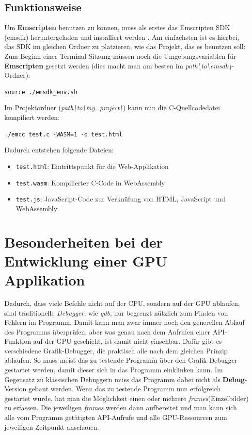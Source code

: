 \documentclass[oneside]{ausarbeitung}
\begin{document}
\subsection{Funktionsweise}
Um \textbf{Emscripten} benutzen zu können, muss als erstes das Emscripten SDK (emsdk) heruntergeladen und installiert werden \cite{emsdk}. Am einfachsten ist es hierbei, das SDK im gleichen Ordner zu platzieren, wie das Projekt, das es benutzen soll:
Zum Beginn einer Terminal-Sitzung müssen noch die Umgebungsvariablen für \textbf{Emscripten} gesetzt werden (dies macht man am besten im \textit{path\textbackslash to\textbackslash emsdk\textbackslash}-Ordner):

\texttt{source ./emsdk\_env.sh}

Im Projektordner (\textit{path\textbackslash to\textbackslash my\_project\textbackslash}) kann nun die C-Quellcodedatei kompiliert werden:

\texttt{./emcc test.c -WASM=1 -o test.html}

Dadurch entstehen folgende Dateien:
\begin{itemize}
\item \texttt{test.html}: Eintrittspunkt für die Web-Applikation
\item \texttt{test.wasm}: Kompilierter C-Code in WebAssembly
\item \texttt{test.js}:   JavaScript-Code zur Verknüfung von HTML, JavaScript und WebAssembly
\end{itemize}

\section{Besonderheiten bei der Entwicklung einer GPU Applikation}
Dadurch, dass viele Befehle nicht auf der \ac{CPU}, sondern auf der \ac{GPU} ablaufen, sind traditionelle \textit{Debugger}, wie \textit{gdb}, nur begrenzt nützlich zum Finden von Fehlern im Programm. Damit kann man zwar immer noch den generellen Ablauf des Programms überprüfen, aber was genau nach dem Aufrufen einer \ac{API}-Funktion auf der \ac{GPU} geschieht, ist damit nicht einsehbar. Dafür gibt es verschiedene Grafik-Debugger, die praktisch alle nach dem gleichen Prinzip ablaufen. So muss meist das zu testende Programm über den Grafik-Debugger gestartet werden, damit dieser sich in das Programm einklinken kann. Im Gegensatz zu klassischen Debuggern muss das Programm dabei nicht als \textbf{Debug}-Version gebaut werden. Wenn das zu testende Programm nun erfolgreich gestartet wurde, hat man die Möglichkeit einen oder mehrere \textit{frames}(Einzelbilder) zu erfassen. Die jeweiligen \textit{frames} werden dann aufbereitet und man kann sich alle vom Programm getätigten \ac{API}-Aufrufe und alle \ac{GPU}-Ressourcen zum jeweiligen Zeitpunkt anschauen.
\end{document}
